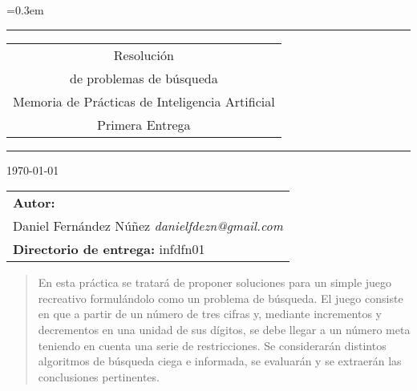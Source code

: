 \documentclass[12pt]{article}
\begin{document}
\setlength\arraycolsep{8pt} %
\setlength\tabcolsep{8pt} %
\renewcommand{\arraystretch}{1.5} %
\parskip=0.3em %
\def\tablename{Tabla} %

\thispagestyle{empty} %
\rule{\textwidth}{1pt} \vspace{2pt} 
\begin{center} 
\Huge
\begin{tabular}{@{}c} 
Resolución \\ 
de problemas de búsqueda\\ 
{\Large Memoria de Prácticas de Inteligencia Artificial}\\ 
{\Large Primera Entrega}\\
\end{tabular} 
\end{center} 
\rule{\textwidth}{1pt} 
% 
\vspace{2cm} \begin{center}\today\end{center} 
% 
\vfill 
% 
\begin{flushright} 
\large 
\begin{tabular}{@{}l} 
{\Large\upshape\bfseries Autor:}\\[8pt] 
Daniel Fernández Núñez \itshape{danielfdezn@gmail.com}\\[10pt] 
{\Large\upshape\bfseries Directorio de entrega:} infdfn01\\[8pt] 
\end{tabular} 
\end{flushright} 

\newpage 
\thispagestyle{empty} %
\begin{abstract} 
En esta práctica se tratará de proponer soluciones para un simple juego recreativo formulándolo como un problema de búsqueda. El juego consiste en que a partir de un número de tres cifras y, mediante incrementos y decrementos en una unidad de sus dígitos, se debe llegar a un número meta teniendo en cuenta una serie de restricciones. Se considerarán distintos algoritmos de búsqueda ciega e informada, 
se evaluarán y se extraerán las conclusiones pertinentes.
\end{abstract} 
\end{document}
